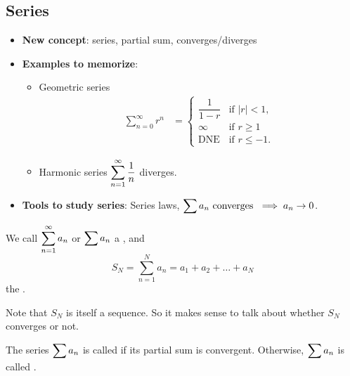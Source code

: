 \subsection{Series} 
\begin{center}
\begin{tcolorbox}
     \begin{itemize}
         \item \textbf{New concept}: series, partial sum, converges/diverges
         \item \textbf{Examples to memorize}: \begin{itemize}
             \item Geometric series
                 \begin{align*}
                \sum_{n=0}^\infty r^n &= \begin{cases} 
                    \dfrac{1}{1 - r} & \text{if } |r| < 1, \\
                    \infty & \text{if } r \geq 1\\
                    \text{DNE} & \text{if } r \leq -1.
                \end{cases}
            \end{align*}
            \item Harmonic series $\displaystyle\sum_{n=1}^\infty \dfrac{1}{n}$ diverges.
         \end{itemize}
         \item \textbf{Tools to study series}: Series laws, $\displaystyle\sum a_n \text{ converges } \implies a_n \to 0$.
     \end{itemize}   
\end{tcolorbox}
\end{center}

\begin{defn}
    We call $\displaystyle\sum_{n=1}^\infty a_n$ or $\displaystyle\sum a_n$ a , and 
    \[S_N = \sum_{n=1}^N a_n = a_1 + a_2 + \ldots + a_N\]
    the . 
\end{defn}

\begin{rmk}
    Note that $S_N$ is itself a sequence. So it makes sense to talk about whether $S_N$ converges or not.
\end{rmk}

\begin{defn}
    The series $\displaystyle\sum a_n$ is called  if its partial sum is convergent. Otherwise, $\displaystyle\sum a_n$ is called .
\end{defn}

